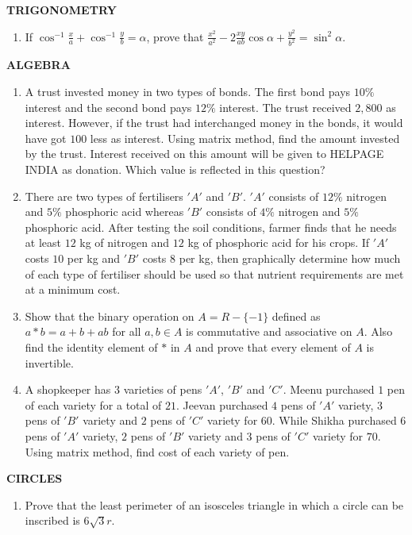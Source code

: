 \documentclass[12pt,-letter paper]{article}
\begin{document}
\begin{center}
	\textbf{TRIGONOMETRY}
\end{center}
\begin{enumerate}
\item If $\cos^{-1}\frac{x}{a}+\cos^{-1}\frac{y}{b}=\alpha$, prove that $\frac{x^2}{a^2}-2\frac{xy}{ab}\cos\alpha+\frac{y^2}{b^2}=\sin^2\alpha$.
\end{enumerate}
\begin{center}
	\textbf{ALGEBRA}
\end{center}
\begin{enumerate}
\item A trust invested money in two types of bonds. The first bond pays $10\%$ interest and the second bond pays $12\%$ interest. The trust received \rupee$2,800$ as interest. However, if the trust had interchanged money in the bonds, it would have got \rupee$100$ less as interest. Using matrix method, find the amount invested by the trust. Interest received on this amount will be given to HELPAGE INDIA as donation. Which value is reflected in this question? 
\item There are two types of fertilisers $'A'$ and $'B'$. $'A'$ consists of $12\%$ nitrogen and $5\%$ phosphoric acid whereas $'B'$ consists of $4\%$ nitrogen and $5\%$ phosphoric acid. After testing the soil conditions, farmer finds that he needs at least $12$ kg of nitrogen and $12$ kg of phosphoric acid for his crops. If $'A'$ costs $10$ per kg and $'B'$ costs $8$ per kg, then graphically determine how much of each type of fertiliser should be used so that nutrient requirements are met at a minimum cost.
\item Show that the binary operation on $A=R-\{-1\}$ defined as $a*b=a+b+ab$ for all $a, b \in A$ is commutative and associative on $A$. Also find the identity element of $*$ in $A$ and prove that every element of $A$ is invertible.
\item A shopkeeper has $3$ varieties of pens $'A'$, $'B'$ and $'C'$. Meenu purchased $1$ pen of each variety for a total of \rupee$21$. Jeevan purchased $4$ pens of $'A'$ variety, $3$ pens of $'B'$ variety and $2$ pens of $'C'$ variety for \rupee$60$. While Shikha purchased 6 pens of $'A'$ variety, $2$ pens of $'B'$ variety and $3$ pens of $'C'$ variety for \rupee$70$. Using matrix method, find cost of each variety of pen.
\end{enumerate}
\begin{center}
	\textbf{CIRCLES}
\end{center}
\begin{enumerate}
\item Prove that the least perimeter of an isosceles triangle in which a circle can be inscribed is 
$6\sqrt{3}r$.

\end{enumerate}
\end{document}

